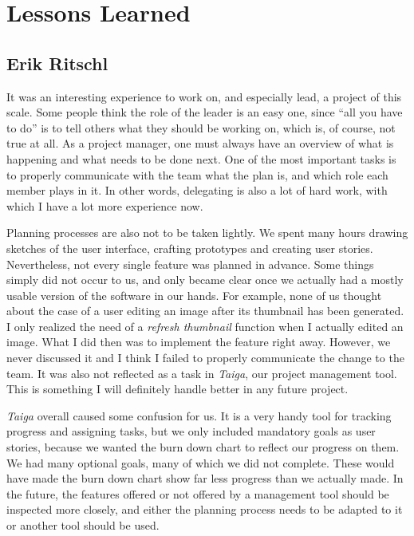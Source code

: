 \section{Lessons Learned}
\def\kapitelautor{}

\subsection{Erik Ritschl}

It was an interesting experience to work on, and especially lead, a project of
this scale. Some people think the role of the leader is an easy one, since ``all you
have to do'' is to tell others what they should be working on, which is, of
course, not true at all. As a project manager, one must always have an overview of
what is happening and what needs to be done next. One of the most important
tasks is to properly communicate with the team what the plan is, and which role
each member plays in it. In other words, delegating is also a lot of hard work,
with which I have a lot more experience now.

Planning processes are also not to be taken lightly. We spent many hours drawing
sketches of the user interface, crafting prototypes and creating user stories.
Nevertheless, not every single feature was planned in advance. Some things
simply did not occur to us, and only became clear once we actually had a
mostly usable version of the software in our hands. For example, none of us
thought about the case of a user editing an image after its thumbnail has
been generated. I only realized the need of a \emph{refresh thumbnail} function
when I actually edited an image. What I did then was to implement the feature
right away. However, we never discussed it and I think I failed to properly
communicate the change to the team. It was also not reflected as a task in
\emph{Taiga}, our project management tool. This is something I will definitely
handle better in any future project.

\emph{Taiga} overall caused some confusion for us. It is a very handy tool for
tracking progress and assigning tasks, but we only included mandatory goals as
user stories, because we wanted the burn down chart to reflect our progress on
them. We had many optional goals, many of which we did not complete. These would
have made the burn down chart show far less progress than we actually made. In
the future, the features offered or not offered by a management tool should be
inspected more closely, and either the planning process needs to be adapted to
it or another tool should be used.

